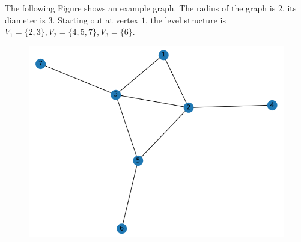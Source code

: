The following Figure shows an example graph. The radius of the graph is $2$, its diameter is $3$. Starting out at vertex $1$, the level structure is $V_1 = \{2,3\}, V_2 = \{4,5,7\}, V_3 = \{6\}$.

\begin{figure}[H]
\centering
\includegraphics[scale=0.5]{images/graphs_03_06.png}
\end{figure}



